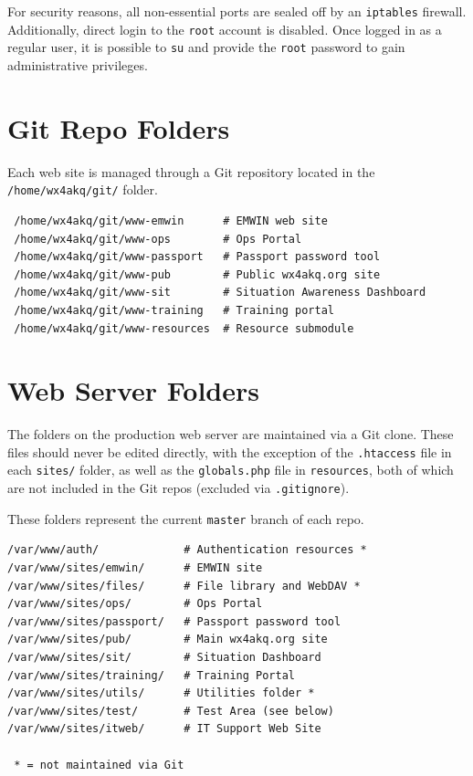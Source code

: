 \documentclass[pdflatex,letterpaper,twoside,12pt]{book}
\begin{document}
For security reasons, all non-essential ports are sealed off by an \texttt{iptables} firewall.  Additionally, direct login to the \texttt{root} account is disabled.  Once logged in as a regular user, it is possible to \texttt{su} and provide the \texttt{root} password to gain administrative privileges.


\section{Git Repo Folders}

Each web site is managed through a Git repository located in the \texttt{/home/wx4akq/git/} folder.

\begin{verbatim}
 /home/wx4akq/git/www-emwin      # EMWIN web site
 /home/wx4akq/git/www-ops        # Ops Portal  
 /home/wx4akq/git/www-passport   # Passport password tool
 /home/wx4akq/git/www-pub        # Public wx4akq.org site
 /home/wx4akq/git/www-sit        # Situation Awareness Dashboard
 /home/wx4akq/git/www-training   # Training portal
 /home/wx4akq/git/www-resources  # Resource submodule
\end{verbatim}



\section{Web Server Folders}

The folders on the production web server are maintained via a Git clone.  These files should never be edited directly, with the exception of the \texttt{.htaccess} file in each \texttt{sites/} folder, as well as the \texttt{globals.php} file in \texttt{resources}, both of which are not included in the Git repos (excluded via \texttt{.gitignore}).

These folders represent the current \texttt{master} branch of each repo.

\begin{verbatim}
/var/www/auth/             # Authentication resources *
/var/www/sites/emwin/      # EMWIN site
/var/www/sites/files/      # File library and WebDAV *
/var/www/sites/ops/        # Ops Portal
/var/www/sites/passport/   # Passport password tool
/var/www/sites/pub/        # Main wx4akq.org site
/var/www/sites/sit/        # Situation Dashboard
/var/www/sites/training/   # Training Portal
/var/www/sites/utils/      # Utilities folder *
/var/www/sites/test/       # Test Area (see below)
/var/www/sites/itweb/      # IT Support Web Site

 * = not maintained via Git
\end{verbatim}
\end{document}
